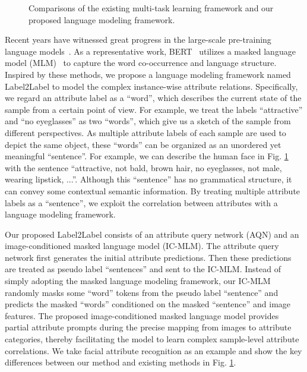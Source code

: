 \documentclass[runningheads]{llncs}
\begin{document}
\begin{figure}[t]
  \centering
  \caption{Comparisons of the existing multi-task learning framework and our proposed language modeling framework.
}
  \label{fig:motivation}
\end{figure}

Recent years have witnessed great progress in the large-scale pre-training language models~\cite{peters2018deep,brown2020language,devlin2018bert}. As a representative work, BERT~\cite{devlin2018bert} utilizes a masked language model (MLM)~\cite{taylor1953cloze} to capture the word co-occurrence and language structure. Inspired by these methods, we propose a language modeling framework named Label2Label to model the complex instance-wise attribute relations. Specifically, we regard an attribute label as a ``word'', which describes the current state of the sample from a certain point of view. For example, we treat the labels ``attractive'' and ``no eyeglasses'' as two ``words'', which give us a sketch of the sample from different perspectives. As multiple attribute labels of each sample are used to depict the same object, these ``words'' can be organized as an unordered yet meaningful ``sentence''. For example, we can describe the human face in Fig. \ref{fig:motivation} with the sentence ``attractive, not bald, brown hair, no eyeglasses, not male, wearing lipstick, ...''. Although this ``sentence'' has no grammatical structure, it can convey some contextual semantic information. By treating multiple attribute labels as a ``sentence'', we exploit the correlation between attributes with a language modeling framework.


Our proposed Label2Label consists of an attribute query network (AQN) and an image-conditioned masked language model (IC-MLM). The attribute query network first generates the initial attribute predictions. Then these predictions are treated as pseudo label ``sentences'' and sent to the IC-MLM. Instead of simply adopting the masked language modeling framework, our IC-MLM randomly masks some ``word'' tokens from the pseudo label ``sentence'' and predicts the masked ``words'' conditioned on the masked ``sentence'' and image features. The proposed image-conditioned masked language model provides partial attribute prompts during the precise mapping from images to attribute categories, thereby facilitating the model to learn complex sample-level attribute correlations.
We take facial attribute recognition as an example and show the key differences between our method and existing methods in Fig. \ref{fig:motivation}.
\end{document}
